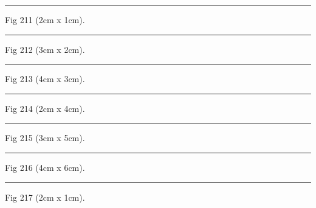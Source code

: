 \documentclass[a4paper,11pt]{article}
\begin{document}
\begin{swarmwrap}%
  \begin{minipage}[t]{2cm}
    \centering
    \rule{\linewidth}{1cm}
    {\footnotesize Fig 211 (2cm x 1cm).}
  \end{minipage}%
\end{swarmwrap}%
\swarmwrapnext
\lipsum[61]%

\begin{swarmwrap}%
  \begin{minipage}[t]{3cm}
    \centering
    \rule{\linewidth}{2cm}
    {\footnotesize Fig 212 (3cm x 2cm).}
  \end{minipage}%
\end{swarmwrap}%
\swarmwrapnext
\lipsum[62]%

\begin{swarmwrap}%
  \begin{minipage}[t]{4cm}
    \centering
    \rule{\linewidth}{3cm}
    {\footnotesize Fig 213 (4cm x 3cm).}
  \end{minipage}%
\end{swarmwrap}%
\swarmwrapnext
\lipsum[63]%

\begin{swarmwrap}%
  \begin{minipage}[t]{2cm}
    \centering
    \rule{\linewidth}{4cm}
    {\footnotesize Fig 214 (2cm x 4cm).}
  \end{minipage}%
\end{swarmwrap}%
\swarmwrapnext
\lipsum[64]%

\begin{swarmwrap}%
  \begin{minipage}[t]{3cm}
    \centering
    \rule{\linewidth}{5cm}
    {\footnotesize Fig 215 (3cm x 5cm).}
  \end{minipage}%
\end{swarmwrap}%
\swarmwrapnext
\lipsum[65]%

\begin{swarmwrap}%
  \begin{minipage}[t]{4cm}
    \centering
    \rule{\linewidth}{6cm}
    {\footnotesize Fig 216 (4cm x 6cm).}
  \end{minipage}%
\end{swarmwrap}%
\swarmwrapnext
\lipsum[66]%

\begin{swarmwrap}%
  \begin{minipage}[t]{2cm}
    \centering
    \rule{\linewidth}{1cm}
    {\footnotesize Fig 217 (2cm x 1cm).}
  \end{minipage}%
\end{swarmwrap}%
\swarmwrapnext
\lipsum[67]%
\end{document}
